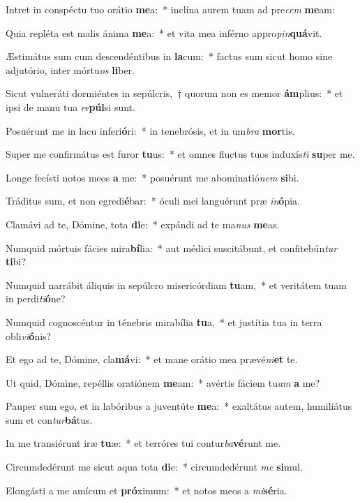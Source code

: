 \item Intret in conspéctu tuo orátio \textbf{me}a:~* inclína aurem tuam ad pre\textit{cem} \textbf{me}am:
\item Quia repléta est malis ánima \textbf{me}a:~* et vita mea inférno appro\textit{pin}\textbf{quá}vit.
\item Æstimátus sum cum descendéntibus in \textbf{la}cum:~* factus sum sicut homo sine adjutório, inter mórtu\textit{os} \textbf{li}ber.
\item Sicut vulneráti dormiéntes in sepúlcris,~† quorum non es memor \textbf{ám}plius:~* et ipsi de manu tua \textit{re}\textbf{púl}si sunt.
\item Posuérunt me in lacu inferi\textbf{ó}ri:~* in tenebrósis, et in um\textit{bra} \textbf{mor}tis.
\item Super me confirmátus est furor \textbf{tu}us:~* et omnes fluctus tuos induxís\textit{ti} \textbf{su}per me.
\item Longe fecísti notos meos \textbf{a} me:~* posuérunt me abominatió\textit{nem} \textbf{si}bi.
\item Tráditus sum, et non egredi\textbf{é}bar:~* óculi mei languérunt præ \textit{in}\textbf{ó}pia.
\item Clamávi ad te, Dómine, tota \textbf{di}e:~* expándi ad te ma\textit{nus} \textbf{me}as.
\item Numquid mórtuis fácies mira\textbf{bí}lia:~* aut médici suscitábunt, et confitebún\textit{tur} \textbf{ti}bi?
\item Numquid narrábit áliquis in sepúlcro misericórdiam \textbf{tu}am,~* et veritátem tuam in perdi\textit{ti}\textbf{ó}ne?
\item Numquid cognoscéntur in ténebris mirabília \textbf{tu}a,~* et justítia tua in terra obli\textit{vi}\textbf{ó}nis?
\item Et ego ad te, Dómine, cla\textbf{má}vi:~* et mane orátio mea prævé\textit{ni}\textbf{et} te.
\item Ut quid, Dómine, repéllis oratiónem \textbf{me}am:~* avértis fáciem tu\textit{am} \textbf{a} me?
\item Pauper sum ego, et in labóribus a juventúte \textbf{me}a:~* exaltátus autem, humiliátus sum et con\textit{tur}\textbf{bá}tus.
\item In me transiérunt iræ \textbf{tu}æ:~* et terróres tui contur\textit{ba}\textbf{vé}runt me.
\item Circumdedérunt me sicut aqua tota \textbf{di}e:~* circumdedérunt \textit{me} \textbf{si}mul.
\item Elongásti a me amícum et \textbf{pró}ximum:~* et notos meos a \textit{mi}\textbf{sé}ria.
